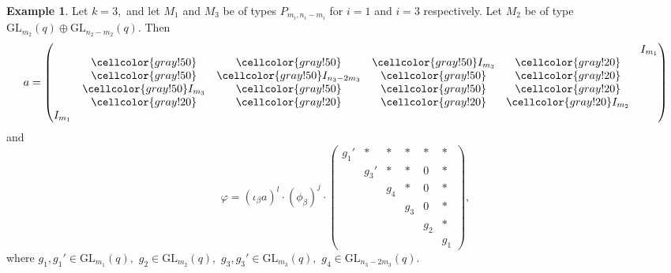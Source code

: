 \documentclass[a4paper,reqno,11pt]{amsart}
\theoremstyle{definition}
\newtheorem{example}[Th]{Example}
\theoremstyle{remark}
\numberwithin{equation}{section}
\newcommand{\GL}{{\mathrm{GL}}}
\begin{document}
\begin{example}
Let $k=3,$ and let $M_1$ and $M_3$ be of types $P_{m_i, n_i-m_i}$ for $i=1$ and $i=3$ respectively. Let $M_2$ be of type $\GL_{m_2}(q) \oplus \GL_{n_2-m_2}(q).$ Then 
$$
a=\begin{pmatrix}
 & & & & &  I_{m_1} \\
 &{\cellcolor{gray!50}} &{\cellcolor{gray!50}} &{\cellcolor{gray!50}} I_{m_3} &{\cellcolor{gray!20}} & \\
 & {\cellcolor{gray!50}} &{\cellcolor{gray!50}} I_{n_3-2m_3} &{\cellcolor{gray!50}} &{\cellcolor{gray!20}} & \\
 &{\cellcolor{gray!50}} I_{m_3} &{\cellcolor{gray!50}} & {\cellcolor{gray!50}} &{\cellcolor{gray!20}} & \\
 & {\cellcolor{gray!20}} & {\cellcolor{gray!20}} &{\cellcolor{gray!20}} &{\cellcolor{gray!20}} I_{m_2} & \\
I_{m_1} & & & & & 
\end{pmatrix}
$$
and $$\varphi = (\iota_{\beta}a)^l \cdot (\phi_{\beta})^j \cdot \begin{pmatrix}
 g_1 '&* &* &* &* &* \\
 & g_3' &* &* &0 &* \\
 & &g_4 &* &0 &* \\
 & & &g_3 &0 &* \\
 & & & & g_2 &* \\
 & & & & & g_1
\end{pmatrix}, $$
where $g_1, g_1' \in \GL_{m_1}(q),$ $g_2 \in \GL_{m_2}(q),$ $g_3, g_3' \in \GL_{m_3}(q),$ $g_4 \in \GL_{n_3-2m_3}(q).$
\end{example}
\end{document}
